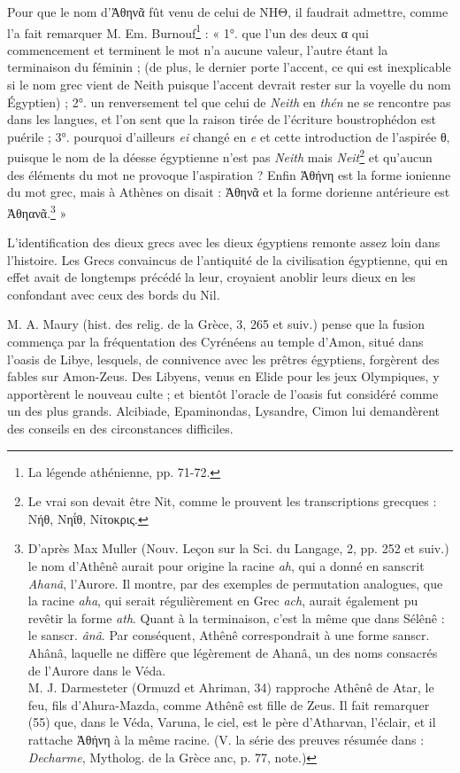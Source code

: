\documentclass[a4paper, 11pt, oneside]{article}
\begin{document}
Pour que le nom d'Ἀθηνᾶ fût venu de celui de ΝΗΘ, il faudrait admettre, comme l'a fait remarquer M. Em. Burnouf\footnote{La légende athénienne, pp. 71-72.} : « 1°. que l'un des deux α qui commencement et terminent le mot n'a aucune valeur, l'autre étant la terminaison du féminin ; (de plus, le dernier porte l'accent, ce qui est inexplicable si le nom grec vient de Neith puisque l'accent devrait rester sur la voyelle du nom Égyptien) ; 2°. un renversement tel que celui de \emph{Neith} en \emph{thén} ne se rencontre pas dans les langues, et l'on sent que la raison tirée de l'écriture boustrophédon est puérile ; 3°. pourquoi d'ailleurs \emph{ei} changé en \emph{e} et cette introduction de l'aspirée θ, puisque le nom de la déesse égyptienne n'est pas \emph{Neith} mais \emph{Neit}\footnote{Le vrai son devait être Nit, comme le prouvent les transcriptions grecques : Νήθ, Νηΐθ, Νίτοκρις.} et qu'aucun des éléments du mot ne provoque l'aspiration ? Enfin Ἀθήνη est la forme ionienne du mot grec, mais à Athènes on disait : Ἀθηνᾶ et la forme dorienne antérieure est Ἀθηανᾶ.\footnote{D'après Max Muller (Nouv. Leçon sur la Sci. du Langage, 2, pp. 252 et suiv.) le nom d'Athênê aurait pour origine la racine \emph{ah}, qui a donné en sanscrit \emph{Ahanâ}, l'Aurore. Il montre, par des exemples de permutation analogues, que la racine \emph{aha}, qui serait régulièrement en Grec \emph{ach}, aurait également pu revêtir la forme \emph{ath}. Quant à la terminaison, c'est la même que dans Sélênê : le sanscr. \emph{ânâ}. Par conséquent, Athênê correspondrait à une forme sanscr. Ahânâ, laquelle ne diffère que légèrement de Ahanâ, un des noms consacrés de l'Aurore dans le Véda.\\\hspace*{5mm}M. J. Darmesteter (Ormuzd et Ahriman, 34) rapproche Athênê de Atar, le feu, fils d'Ahura-Mazda, comme Athênê est fille de Zeus. Il fait remarquer (55) que, dans le Véda, Varuna, le ciel, est le père d'Atharvan, l'éclair, et il rattache Ἀθήνη à la même racine. (V. la série des preuves résumée dans : \emph{Decharme}, Mytholog. de la Grèce anc, p. 77, note.)} »

L'identification des dieux grecs avec les dieux égyptiens remonte assez loin dans l'histoire. Les Grecs convaincus de l'antiquité de la civilisation égyptienne, qui en effet avait de longtemps précédé la leur, croyaient anoblir leurs dieux en les confondant avec ceux des bords du Nil.

M. A. Maury (hist. des relig. de la Grèce, 3, 265 et suiv.) pense que la fusion commença par la fréquentation des Cyrénéens au temple d'Amon, situé dans l'oasis de Libye, lesquels, de connivence avec les prêtres égyptiens, forgèrent des fables sur Amon-Zeus. Des Libyens, venus en Elide pour les jeux Olympiques, y apportèrent le nouveau culte ; et bientôt l'oracle de l'oasis fut considéré comme un des plus grands. Alcibiade, Epaminondas, Lysandre, Cimon lui demandèrent des conseils en des circonstances difficiles.
\end{document}
